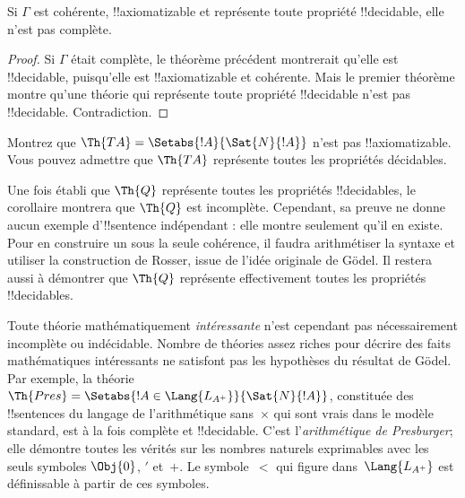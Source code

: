 \documentclass[../../../include/open-logic-section]{subfiles}
\begin{document}
\begin{cor}
Si $\Gamma$ est cohérente, !!{axiomatizable} et représente toute
propriété !!{decidable}, elle n'est pas complète.
\end{cor}

\begin{proof}
Si $\Gamma$ était complète, le théorème précédent montrerait qu'elle
est !!{decidable}, puisqu'elle est !!{axiomatizable} et cohérente.
Mais le premier théorème montre qu'une théorie qui représente toute
propriété !!{decidable} n'est pas !!{decidable}. Contradiction.
\end{proof}

\begin{prob}
Montrez que $\Th{TA}=\Setabs{!A}{\Sat{N}{!A}}$ n'est pas
!!{axiomatizable}. Vous pouvez admettre que $\Th{TA}$ représente
toutes les propriétés décidables.
\end{prob}

Une fois établi que $\Th{Q}$ représente toutes les propriétés
!!{decidable}s, le corollaire montrera que $\Th{Q}$ est incomplète.
Cependant, sa preuve ne donne aucun exemple d'!!{sentence}
indépendant : elle montre seulement qu'il en existe. Pour en construire
un sous la seule cohérence, il faudra arithmétiser la syntaxe et utiliser
la construction de Rosser, issue de l'idée originale de Gödel. Il restera aussi à démontrer que $\Th{Q}$ représente
effectivement toutes les propriétés !!{decidable}s.

Toute théorie mathématiquement \emph{intéressante} n'est cependant pas
nécessairement incomplète ou indécidable. Nombre de théories assez
riches pour décrire des faits mathématiques intéressants ne satisfont
pas les hypothèses du résultat de Gödel. Par exemple, la théorie
$\Th{Pres}=\Setabs{!A\in\Lang{L_{A^+}}}{\Sat{N}{!A}}$, constituée
des !!{sentence}s du langage de l'arithmétique sans~$\times$ qui sont
vrais dans le modèle standard, est à la fois complète et !!{decidable}.
C'est l'\emph{arithmétique de Presburger}; elle démontre toutes les
vérités sur les nombres naturels exprimables avec les seuls symboles
$\Obj{0}$, $\prime$ et~$+$. Le symbole~$<$ qui figure dans~$\Lang{L_{A^+}}$ est définissable à partir de ces symboles.
\end{document}
